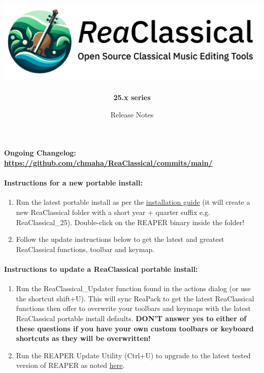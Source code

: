\documentclass[british]{article}
\begin{document}
\title{\includegraphics[width=1\linewidth]{PDF-Manual/user_guide_images/reaclassical_os}}
\author{\textbf{25.x series}}
\date{Release Notes}
\maketitle

\paragraph*{Ongoing Changelog: \protect\href{https://github.com/chmaha/ReaClassical/commits/main/}{https://github.com/chmaha/ReaClassical/commits/main/}}

\paragraph*{Instructions for a new portable install:}
\begin{enumerate}
\item Run the latest portable install as per the \href{https://github.com/chmaha/ReaClassical/blob/main/install_instructions.md}{installation guide}
(it will create a new ReaClassical folder with a short year + quarter
suffix e.g. \textquotedbl ReaClassical\_25\textquotedbl ). Double-click
on the REAPER binary inside the folder!
\item Follow the update instructions below to get the latest and greatest
ReaClassical functions, toolbar and keymap.
\end{enumerate}

\paragraph*{Instructions to update a ReaClassical portable install:}
\begin{enumerate}
\item Run the ReaClassical\_Updater function found in the actions dialog
(or use the shortcut shift+U). This will sync ReaPack to get the latest
ReaClassical functions then offer to overwrite your toolbars and keymaps
with the latest ReaClassical portable install defaults. \textbf{DON'T
answer yes to either of these questions if you have your own custom
toolbars or keyboard shortcuts as they will be overwritten! }
\item Run the REAPER Update Utility (Ctrl+U) to upgrade to the latest tested
version of REAPER as noted \href{https://raw.githubusercontent.com/chmaha/ReaClassical/main/tested_reaper_ver.txt}{here}.
\end{enumerate}
\end{document}
